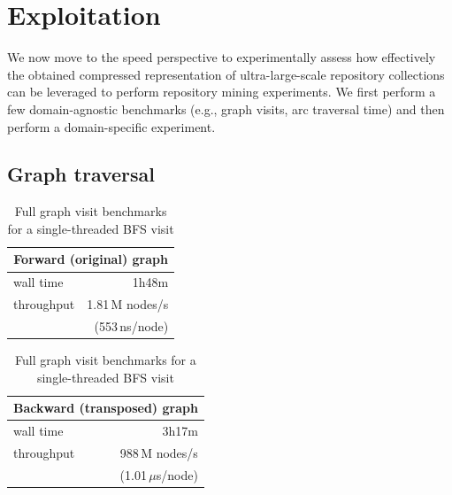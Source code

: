 \section{Exploitation}%
\label{sec:compression-exploitation}

We now move to the speed perspective to experimentally assess how effectively
the obtained compressed representation of ultra-large-scale repository
collections can be leveraged to perform repository mining experiments. We first
perform a few domain-agnostic benchmarks (e.g., graph visits, arc traversal
time) and then perform a domain-specific experiment.


\subsection{Graph traversal}%
\label{sec:compression-exptraversal}

\begin{table}
  \centering
  \caption{Full graph visit benchmarks for a single-threaded BFS visit}%
  \label{tab:compression-bfs-benchmark}
  
  \hfill
  \begin{tabular}{lr}
    \multicolumn{2}{c}{\textbf{Forward (original) graph}} \\
    \hline\hline
    wall time      & 1h48m \\
    throughput     & 1.81\,M nodes/s \\
                   & (553\,ns/node) \\
    \hline
  \end{tabular}
  \hfill
  \begin{tabular}{lr}
    \multicolumn{2}{c}{\textbf{Backward (transposed) graph}} \\
    \hline\hline
    wall time      & 3h17m\\
    throughput     & 988\,M nodes/s \\
                   & (1.01\,$\mu$s/node) \\
    \hline
  \end{tabular}
  \hfill
\end{table}

